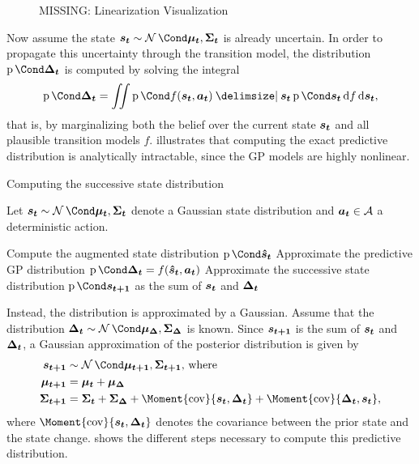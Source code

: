 \begin{figure}[t]
    \centering
    \caption{MISSING: Linearization Visualization}
    \label{fig:linearization}
\end{figure}
Now assume the state $\rv{s_t} \sim \Gaussian{\mat{\mu_t}, \mat{\Sigma_t}}$ is already uncertain.
In order to propagate this uncertainty through the transition model, the distribution $\Prob{\rv{\Delta_t}}$ is computed by solving the integral
\begin{align}
    \Prob{\rv{\Delta_t}} = \iint \Prob{f(\rv{s_t}, \mat{a_t}) \given \rv{s_t}} \Prob{\rv{s_t}} \diff f \diff \rv{s_t},
\end{align}
that is, by marginalizing both the belief over the current state $\bm{s_t}$ and all plausible transition models $f$.
 illustrates that computing the exact predictive distribution is analytically intractable, since the GP models are highly nonlinear.

\begin{algorithm}[t]
    \caption{Computing the successive state distribution}
    \label{alg:linearization}
    Let $\rv{s_t} \sim \Gaussian{\mat{\mu_t}, \mat{\Sigma_t}}$ denote a Gaussian state distribution and $\bm{a_t} \in \mathcal{A}$ a deterministic action.
    \begin{algorithmic}[1]
        \State Compute the augmented state distribution $\Prob{\rv{\hat{s}_t}}$
        \State Approximate the predictive GP distribution $\Prob{\rv{\Delta_t}} = f(\rv{\hat{s}_t}, \mat{a_t})$
        \State Approximate the successive state distribution $\Prob{\rv{s_{t+1}}}$ as the sum of $\bm{s_t}$ and $\bm{\Delta_t}$
    \end{algorithmic}
\end{algorithm}
Instead, the distribution is approximated by a Gaussian.
Assume that the distribution $\rv{\Delta_t} \sim \Gaussian{\mat{\mu_\Delta}, \mat{\Sigma_\Delta}}$ is known.
Since $\bm{s_{t+1}}$ is the sum of $\bm{s_t}$ and $\bm{\Delta_t}$, a Gaussian approximation of the posterior distribution is given by
\begin{align}
    \rv{s_{t+1}} &\sim \Gaussian{\mat{\mu_{t+1}}, \mat{\Sigma_{t+1}}} \text{, where} \\
    \mat{\mu_{t+1}} &= \mat{\mu_t} + \mat{\mu_\Delta} \\
    \mat{\Sigma_{t+1}} &= \mat{\Sigma_t} + \mat{\Sigma_\Delta} + \Moment{\cov}{\rv{s_t}, \rv{\Delta_t}} + \Moment{\cov}{\rv{\Delta_t}, \rv{s_t}},
\end{align}
where $\Moment{\cov}{\rv{s_t}, \rv{\Delta_t}}$ denotes the covariance between the prior state and the state change.
 shows the different steps necessary to compute this predictive distribution.

